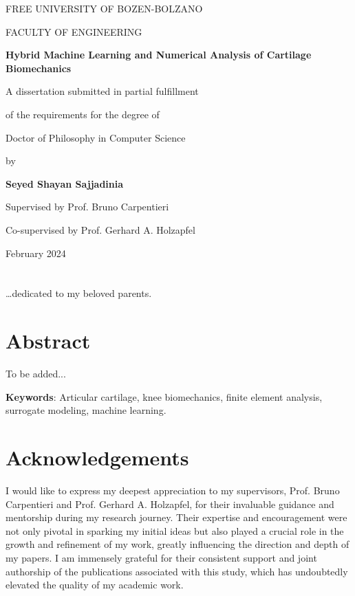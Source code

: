 \documentclass[12pt,a4paper]{report}
\begin{document}
\begin{titlepage}
    \centering
    \vspace*{1.5cm}
    \textsc{FREE UNIVERSITY OF BOZEN-BOLZANO}\par
    \textsc{FACULTY OF ENGINEERING}\par
    \vspace{2.5cm}
    {\LARGE\bfseries Hybrid Machine Learning and Numerical Analysis of Cartilage Biomechanics\par}
    \vspace{2cm}
    A dissertation submitted in partial fulfillment\par
    of the requirements for the degree of\par
    \vspace{0.5cm}
    {\Large Doctor of Philosophy in Computer Science\par}
    \vspace{2.5cm}
    by\par
    \vspace{0.5cm}
    {\Large \textbf{Seyed Shayan Sajjadinia}\par}
    \vspace{3cm}
    Supervised by Prof. Bruno Carpentieri\par
    Co-supervised by Prof. Gerhard A. Holzapfel\par
    \vspace{1.5cm}
    February 2024
\end{titlepage}

\thispagestyle{empty}
\mbox{}
\clearpage


\chapter*{}
\ldots dedicated to my beloved parents.


\chapter*{Abstract}
To be added...

\noindent
\textbf{Keywords}: Articular cartilage, knee biomechanics, finite element analysis, surrogate modeling, machine learning.


\chapter*{Acknowledgements}
%
I would like to express my deepest appreciation to my supervisors, Prof. Bruno Carpentieri and Prof. Gerhard A. Holzapfel, for their invaluable guidance and mentorship during my research journey. Their expertise and encouragement were not only pivotal in sparking my initial ideas but also played a crucial role in the growth and refinement of my work, greatly influencing the direction and depth of my papers. I am immensely grateful for their consistent support and joint authorship of the publications associated with this study, which has undoubtedly elevated the quality of my academic work.
\end{document}
